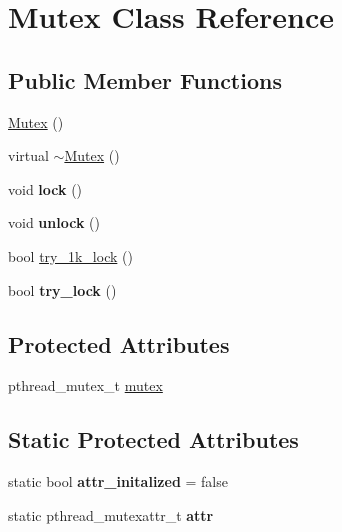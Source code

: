 \hypertarget{classMutex}{\section{\-Mutex \-Class \-Reference}
\label{classMutex}
}
\subsection*{\-Public \-Member \-Functions}
\begin{DoxyCompactItemize}
\item 
\hyperlink{classMutex_a593423d868daf926c7b0d63a833ae29a}{\-Mutex} ()
\item 
virtual \hyperlink{classMutex_ac9e9182407f5f74892318607888e9be4}{$\sim$\-Mutex} ()
\item 
\hypertarget{classMutex_ad91be808bf0a60a16f10b897ec246d3a}{void {\bfseries lock} ()}\label{classMutex_ad91be808bf0a60a16f10b897ec246d3a}

\item 
\hypertarget{classMutex_a546a5b797ba29959357586aa2b3740a8}{void {\bfseries unlock} ()}\label{classMutex_a546a5b797ba29959357586aa2b3740a8}

\item 
bool \hyperlink{classMutex_a9dc89e7486c13d892d31a3795c8ea3cc}{try\-\_\-1k\-\_\-lock} ()
\item 
\hypertarget{classMutex_a85bdf2b7c3d9ce789c61f8bc2a127c8a}{bool {\bfseries try\-\_\-lock} ()}\label{classMutex_a85bdf2b7c3d9ce789c61f8bc2a127c8a}

\end{DoxyCompactItemize}
\subsection*{\-Protected \-Attributes}
\begin{DoxyCompactItemize}
\item 
pthread\-\_\-mutex\-\_\-t \hyperlink{classMutex_a8feb0b01916c1feedd1f0c0dcd74081b}{mutex}
\end{DoxyCompactItemize}
\subsection*{\-Static \-Protected \-Attributes}
\begin{DoxyCompactItemize}
\item 
\hypertarget{classMutex_ad7ee7f8bf85bcdc0cd99f7fb82cd9f83}{static bool {\bfseries attr\-\_\-initalized} = false}\label{classMutex_ad7ee7f8bf85bcdc0cd99f7fb82cd9f83}

\item 
\hypertarget{classMutex_a7c27b9401231941ebf4cce6cfc81192c}{static pthread\-\_\-mutexattr\-\_\-t {\bfseries attr}}\label{classMutex_a7c27b9401231941ebf4cce6cfc81192c}

\end{DoxyCompactItemize}


